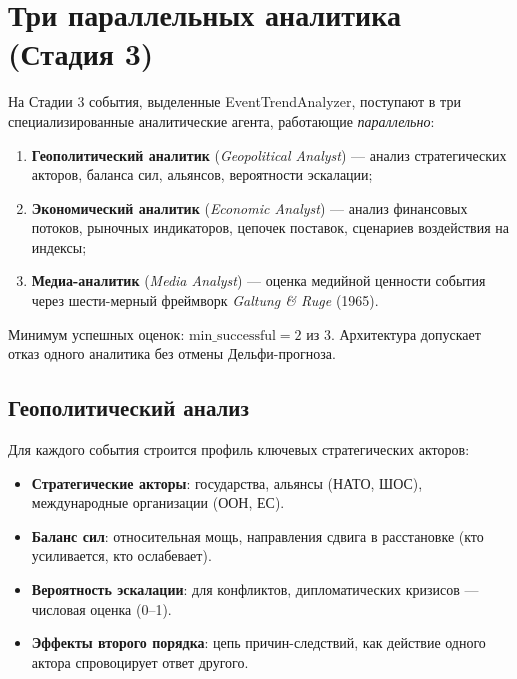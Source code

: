 
\section{Три параллельных аналитика (Стадия 3)}


На Стадии 3 события, выделенные EventTrendAnalyzer, поступают в три специализированные аналитические агента, работающие \emph{параллельно}:

\begin{enumerate}
    \item \textbf{Геополитический аналитик} (\emph{Geopolitical Analyst}) — анализ стратегических акторов, баланса сил, альянсов, вероятности эскалации;
    \item \textbf{Экономический аналитик} (\emph{Economic Analyst}) — анализ финансовых потоков, рыночных индикаторов, цепочек поставок, сценариев воздействия на индексы;
    \item \textbf{Медиа-аналитик} (\emph{Media Analyst}) — оценка медийной ценности события через шести-мерный фреймворк \emph{Galtung \& Ruge} (1965).
\end{enumerate}

Минимум успешных оценок: $\text{min\_successful} = 2$ из 3. Архитектура допускает отказ одного аналитика без отмены Дельфи-прогноза.

\subsection{Геополитический анализ}

Для каждого события строится профиль ключевых стратегических акторов:
\begin{itemize}
    \item \textbf{Стратегические акторы}: государства, альянсы (НАТО, ШОС), международные организации (ООН, ЕС).
    \item \textbf{Баланс сил}: относительная мощь, направления сдвига в расстановке (кто усиливается, кто ослабевает).
    \item \textbf{Вероятность эскалации}: для конфликтов, дипломатических кризисов — числовая оценка (0–1).
    \item \textbf{Эффекты второго порядка}: цепь причин-следствий, как действие одного актора спровоцирует ответ другого.
\end{itemize}

